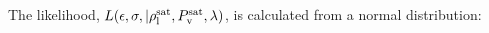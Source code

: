 \documentclass[preprint,letterpaper,floatfix,citeautoscript,aip,jcp]{revtex4-1}
\begin{document}
The likelihood, $L(\epsilon,\sigma,|\rho_{\rm l}^{\rm sat},P_{\rm v}^{\rm sat},\lambda)$, is calculated from a normal distribution:
\end{document}

